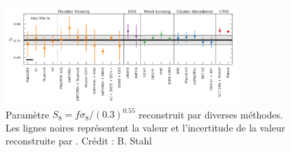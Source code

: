 \documentclass{book}
\begin{document}
\begin{figure}[h]
    \centering
    \includegraphics[width=0.8\textwidth]{figures/Stahl_fig_6.png}
    \caption{Paramètre $S_8 = f \sigma_8/(0.3)^{0.55}$ reconstruit par diverses méthodes. Les lignes noires représentent la valeur et l'incertitude de la valeur reconstruite par \cite{stahl_peculiar-velocity_2021}. Crédit : B. Stahl}
    \label{fig:stahl}
\end{figure}


\printbibliography
\end{document}
